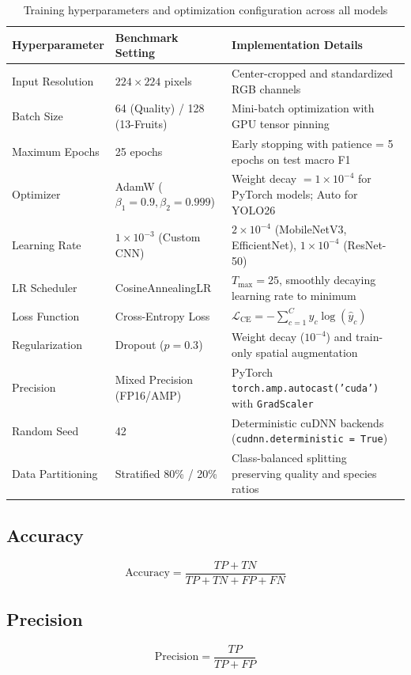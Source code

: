 \documentclass[11pt,a4paper]{article}
\begin{document}
\begin{table}[H]
\centering\small
\begin{tabular}{|l|l|p{}|}
\hline
\textbf{Hyperparameter} & \textbf{Benchmark Setting} & \textbf{Implementation Details} \\
\hline
Input Resolution & $224 \times 224$ pixels & Center-cropped and standardized RGB channels \\ \hline
Batch Size & 64 (Quality) / 128 (13-Fruits) & Mini-batch optimization with GPU tensor pinning \\ \hline
Maximum Epochs & 25 epochs & Early stopping with patience = 5 epochs on test macro F1 \\ \hline
Optimizer & AdamW ($\beta_1=0.9, \beta_2=0.999$) & Weight decay $= 1 \times 10^{-4}$ for PyTorch models; Auto for YOLO26 \\ \hline
Learning Rate & $1 \times 10^{-3}$ (Custom CNN) & $2 \times 10^{-4}$ (MobileNetV3, EfficientNet), $1 \times 10^{-4}$ (ResNet-50) \\ \hline
LR Scheduler & CosineAnnealingLR & $T_{\max} = 25$, smoothly decaying learning rate to minimum \\ \hline
Loss Function & Cross-Entropy Loss & $\mathcal{L}_{\text{CE}} = -\sum_{c=1}^C y_c \log(\hat{y}_c)$ \\ \hline
Regularization & Dropout ($p=0.3$) & Weight decay ($10^{-4}$) and train-only spatial augmentation \\ \hline
Precision & Mixed Precision (FP16/AMP) & PyTorch \texttt{torch.amp.autocast('cuda')} with \texttt{GradScaler} \\ \hline
Random Seed & 42 & Deterministic cuDNN backends (\texttt{cudnn.deterministic = True}) \\ \hline
Data Partitioning & Stratified 80\% / 20\% & Class-balanced splitting preserving quality and species ratios \\ \hline
\end{tabular}
\caption{Training hyperparameters and optimization configuration across all models}
\label{tab:training-config}
\end{table}
\subsection{Accuracy}
\begin{equation}
    \text{Accuracy} = \frac{TP + TN}{TP + TN + FP + FN}
\end{equation}

\subsection{Precision}
\begin{equation}
    \text{Precision} = \frac{TP}{TP + FP}
\end{equation}
\end{document}
